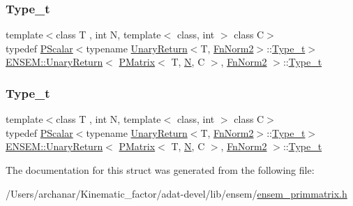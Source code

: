 \subsubsection{\texorpdfstring{Type\_t}{Type\_t}\hspace{0.1cm}{\footnotesize\ttfamily [2/3]}}
{\footnotesize\ttfamily template$<$class T , int N, template$<$ class, int $>$ class C$>$ \\
typedef \mbox{\hyperlink{classENSEM_1_1PScalar}{P\+Scalar}}$<$typename \mbox{\hyperlink{structENSEM_1_1UnaryReturn}{Unary\+Return}}$<$T, \mbox{\hyperlink{structENSEM_1_1FnNorm2}{Fn\+Norm2}}$>$\+::\mbox{\hyperlink{structENSEM_1_1UnaryReturn_3_01PMatrix_3_01T_00_01N_00_01C_01_4_00_01FnNorm2_01_4_ae63cc877c1d04c931821830f6af23b23}{Type\+\_\+t}}$>$ \mbox{\hyperlink{structENSEM_1_1UnaryReturn}{E\+N\+S\+E\+M\+::\+Unary\+Return}}$<$ \mbox{\hyperlink{classENSEM_1_1PMatrix}{P\+Matrix}}$<$ T, \mbox{\hyperlink{adat__devel_2lib_2hadron_2operator__name__util_8cc_a7722c8ecbb62d99aee7ce68b1752f337}{N}}, C $>$, \mbox{\hyperlink{structENSEM_1_1FnNorm2}{Fn\+Norm2}} $>$\+::\mbox{\hyperlink{structENSEM_1_1UnaryReturn_3_01PMatrix_3_01T_00_01N_00_01C_01_4_00_01FnNorm2_01_4_ae63cc877c1d04c931821830f6af23b23}{Type\+\_\+t}}}

\mbox{\label{structENSEM_1_1UnaryReturn_3_01PMatrix_3_01T_00_01N_00_01C_01_4_00_01FnNorm2_01_4_ae63cc877c1d04c931821830f6af23b23}} 
\subsubsection{\texorpdfstring{Type\_t}{Type\_t}\hspace{0.1cm}{\footnotesize\ttfamily [3/3]}}
{\footnotesize\ttfamily template$<$class T , int N, template$<$ class, int $>$ class C$>$ \\
typedef \mbox{\hyperlink{classENSEM_1_1PScalar}{P\+Scalar}}$<$typename \mbox{\hyperlink{structENSEM_1_1UnaryReturn}{Unary\+Return}}$<$T, \mbox{\hyperlink{structENSEM_1_1FnNorm2}{Fn\+Norm2}}$>$\+::\mbox{\hyperlink{structENSEM_1_1UnaryReturn_3_01PMatrix_3_01T_00_01N_00_01C_01_4_00_01FnNorm2_01_4_ae63cc877c1d04c931821830f6af23b23}{Type\+\_\+t}}$>$ \mbox{\hyperlink{structENSEM_1_1UnaryReturn}{E\+N\+S\+E\+M\+::\+Unary\+Return}}$<$ \mbox{\hyperlink{classENSEM_1_1PMatrix}{P\+Matrix}}$<$ T, \mbox{\hyperlink{adat__devel_2lib_2hadron_2operator__name__util_8cc_a7722c8ecbb62d99aee7ce68b1752f337}{N}}, C $>$, \mbox{\hyperlink{structENSEM_1_1FnNorm2}{Fn\+Norm2}} $>$\+::\mbox{\hyperlink{structENSEM_1_1UnaryReturn_3_01PMatrix_3_01T_00_01N_00_01C_01_4_00_01FnNorm2_01_4_ae63cc877c1d04c931821830f6af23b23}{Type\+\_\+t}}}



The documentation for this struct was generated from the following file\+:\begin{DoxyCompactItemize}
\item 
/\+Users/archanar/\+Kinematic\+\_\+factor/adat-\/devel/lib/ensem/\mbox{\hyperlink{adat-devel_2lib_2ensem_2ensem__primmatrix_8h}{ensem\+\_\+primmatrix.\+h}}\end{DoxyCompactItemize}
